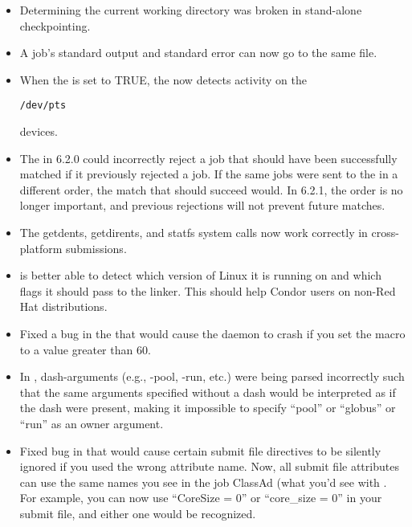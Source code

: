 \begin{itemize}
\item Determining the current working directory was broken in stand-alone
checkpointing. 

\item A job's standard output and standard error can now go to the same file.

\item When the  is set to TRUE, the
 now detects activity on the 
\begin{verbatim}/dev/pts\end{verbatim} devices.  

\item The  in 6.2.0 could incorrectly reject a job
that should have been successfully matched if it previously rejected a 
job. If the same jobs were sent to the  in a different
order, the match that should succeed would. In 6.2.1, the order is no longer
important, and previous rejections will not prevent future matches.

\item The getdents, getdirents, and statfs system calls now work correctly in 
cross-platform submissions.

\item {} is better able to detect which version of Linux
it is running on and which flags it should pass to the linker. This should
help Condor users on non-Red Hat distributions.

\item Fixed a bug in the  that would cause the daemon
to crash if you set the  macro to a value
greater than 60.

\item In , dash-arguments (e.g., -pool, -run, etc.) were being
parsed incorrectly such that the same arguments specified without a
dash would be interpreted as if the dash were present, making it
impossible to specify ``pool'' or ``globus'' or ``run'' as an owner
argument.

\item Fixed bug in  that would cause certain submit
file directives to be silently ignored if you used the wrong attribute
name.  
Now, all submit file attributes can use the same names you see in the
job ClassAd (what you'd see with  .
For example, you can now use ``CoreSize = 0''  or ``core\_size = 0''
in your submit file, and either one would be recognized.


\end{itemize}
